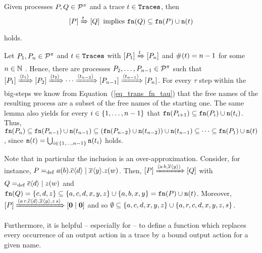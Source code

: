 \begin{lemma}
\label{lem_bigstep_fn}
Given processes $P,Q\in\mathcal P^{\pi}$ and a trace $t\in\mathtt{Traces}$, then
\[\left[P\right]\xRightarrow{t}\left[Q\right] \text{ implies } \mathtt{fn}(Q)\subseteq\mathtt{fn}(P)\cup\mathtt{n}(t)\]
holds.
\end{lemma}
\begin{prf}
Let $P_1,P_n\in\mathcal P^{\pi}$ and $t\in\mathtt{Traces}$ with $\left[P_1\right]\xRightarrow{t}\left[P_n\right]$ and $\#(t)=n-1$ for some $n\in\mathbb N$ . Hence, there are processes $P_2,\ldots,P_{n-1}\in\mathcal P^{\pi}$ such that $\left[P_1\right]\xRightarrow{\langle t_1\rangle}\left[P_2\right]\xRightarrow{\langle t_2\rangle}\cdots\xRightarrow{\langle t_{n-2}\rangle}\left[P_{n-1}\right]\xRightarrow{\langle t_{n-1}\rangle}\left[P_n\right]$. For every $\tau$ step within the big-steps we know from  Equation~(\ref{eq_trans_fn_tau}) that the free names of the resulting process are a subset of the free names of the starting one. The same lemma also yields for every $i\in\set{1,\ldots,n-1}$ that $\mathtt{fn}(P_{i+1})\subseteq{}\mathtt{fn}(P_i)\cup\mathtt{n}(t_{i})$. Thus, $\mathtt{fn}(P_n)\subseteq{}\mathtt{fn}(P_{n-1})\cup\mathtt{n}(t_{n-1})\subseteq\left(\mathtt{fn}(P_{n-2})\cup\mathtt{n}(t_{n-2})\right)\cup\mathtt{n}(t_{n-1}) \subseteq \cdots \subseteq\mathtt{fn}(P_1)\cup\mathtt{n}(t)$, since $\n{t}=\bigcup_{i\in{}\set{1,\ldots,n-1}}\n{t_i}$ holds.
\end{prf}

Note that in particular the inclusion is an over-approximation. Consider, for instance, $P=_{\mathrm{def}}a(b).\overline{c}\langle d\rangle \mid \overline{x}\langle y\rangle.z(w)$. Then, $\left[P\right]\xRightarrow{\langle a\,b,\overline{x}\langle y\rangle\rangle}\left[Q\right]$ with $Q=_{\mathrm{def}}{}\overline{c}\langle d\rangle \mid z(w)$ and $\fn{Q}=\set{c,d,z}\subseteq\set{a,c,d,x,y,z}\cup\set{a, b, x, y}=\fn{P}\cup\n{t}$. Moreover, $\left[P\right]\xRightarrow{\langle a\,r, \overline{c}\langle d\rangle, \overline{x}\langle y\rangle, z\,s\rangle}\left[\mathbf{0} \mid \mathbf{0}\right]$ and so $\emptyset\subseteq\set{a,c,d,x,y,z}\cup\set{a, r, c,d,x,y,z,s}$.

Furthermore, it is helpful -- especially for  -- to define a function which replaces every occurrence of an output action in a trace by a bound output action for a given name.

